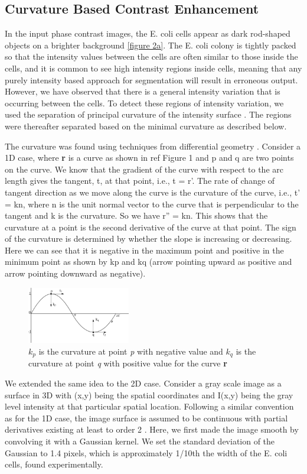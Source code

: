 \documentclass[journal]{IEEEtran}
\begin{document}
\subsection{Curvature Based Contrast Enhancement }
In the input phase contrast images, the E. coli cells appear as dark rod-shaped objects on a brighter background \ref {figure 2a}. The E. coli colony is tightly packed so that the intensity values between the cells are often similar to those inside the cells, and it is common to see high intensity regions inside cells, meaning that any purely intensity based approach for segmentation will result in erroneous output. However, we have observed that there is a general intensity variation that is occurring between the cells. To detect these regions of intensity variation, we used the separation of principal curvature of the intensity surface \cite {willmoreintroduction1959}. The regions were thereafter separated based on the minimal curvature as described below. 

The curvature was found using techniques from differential geometry \cite  {willmoreintroduction1959}. Consider a 1D case, where \textbf{r} is a curve as shown in ref Figure 1 and p and q are two points on the curve. We know that the gradient of the curve with respect to the arc length gives the tangent, t, at that point, i.e., t = r’. The rate of change of tangent direction as we move along the curve is the curvature of the curve, i.e., t’ = kn, where n is the unit normal vector to the curve that is perpendicular to the tangent and k is the curvature. So we have r” = kn. This shows that the curvature at a point is the second derivative of the curve at that point.  The sign of the curvature is determined by whether the slope is increasing or decreasing. Here we can see that it is negative in the maximum point and positive in the minimum point as shown by kp and kq (arrow pointing upward as positive and arrow pointing downward as negative).
\begin{figure}[t ]
	\begin{center}
		\includegraphics[width=45mm]{fig1cuve.png}
		\caption{$k_p$ is the curvature at point \textit{p} with negative value and $k_q$ is the curvature at point \textit{q} with positive value for the curve \textbf{r}}
		\label{fig:curve}
	\end{center}    
\end{figure}
We extended the same idea to the 2D case. Consider a gray scale image as a surface in 3D with (x,y) being the spatial coordinates and I(x,y) being the gray level intensity at that particular spatial location. Following a similar convention as for the 1D case, the image surface is assumed to be continuous with partial derivatives existing at least to order 2 \cite {willmoreintroduction1959}. Here, we first made the image smooth by convolving it with a Gaussian kernel. We set the standard deviation of the Gaussian to 1.4 pixels, which is approximately 1/10th the width of the E. coli cells, found experimentally.
\end{document}
